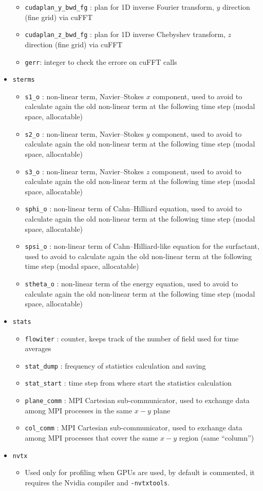 \begin{itemize}
\begin{itemize}
\item \texttt{cudaplan\_y\_bwd\_fg} : plan for 1D inverse Fourier transform, $y$ direction (fine grid) via cuFFT
\item \texttt{cudaplan\_z\_bwd\_fg} : plan for 1D inverse Chebyshev transform, $z$ direction (fine grid) via cuFFT
\item \texttt{gerr}: integer to check the errore on cuFFT calls
\end{itemize}
\item \texttt{sterms}
\begin{itemize}
\item \texttt{s1\_o} : non-linear term, Navier--Stokes $x$ component, used to avoid to calculate again the old non-linear term at the following time step (modal space, allocatable)
\item \texttt{s2\_o} : non-linear term, Navier--Stokes $y$ component, used to avoid to calculate again the old non-linear term at the following time step (modal space, allocatable)
\item \texttt{s3\_o} : non-linear term, Navier--Stokes $z$ component, used to avoid to calculate again the old non-linear term at the following time step (modal space, allocatable)
\item \texttt{sphi\_o} : non-linear term of Cahn--Hilliard equation, used to avoid to calculate again the old non-linear term at the following time step (modal space, allocatable)
\item \texttt{spsi\_o} : non-linear term of Cahn--Hilliard-like equation for the surfactant, used to avoid to calculate again the old non-linear term at the following time step (modal space, allocatable)
\item \texttt{stheta\_o} : non-linear term of the energy equation, used to avoid to calculate again the old non-linear term at the following time step (modal space, allocatable)
\end{itemize}
\item \texttt{stats}
\begin{itemize}
\item \texttt{flowiter} : counter, keeps track of the number of field used for time averages
\item \texttt{stat\_dump} : frequency of statistics calculation and saving
\item \texttt{stat\_start} : time step from where start the statistics calculation
\item \texttt{plane\_comm} : MPI Cartesian sub-communicator, used to exchange data among MPI processes in the same $x-y$ plane
\item \texttt{col\_comm} : MPI Cartesian sub-communicator, used to exchange data among MPI processes that cover the same $x-y$ region (same ``column'')
\end{itemize}
\item \texttt{nvtx}
\begin{itemize}
\item Used only for profiling when GPUs are used, by default is commented, it requires the Nvidia compiler and \texttt{-nvtxtools}.
\end{itemize}
\end{itemize}


